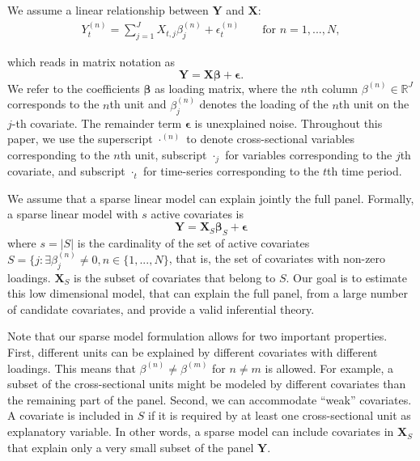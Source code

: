 \documentclass[11pt]{article}
\newcommand{\RR}{\mathbb{R}}
\begin{document}
	We assume a linear relationship between $\bm{Y}$ and $\bm{X}$:
	\begin{align*}
		Y_{t}^{(n)} = \sum_{j=1}^J X_{t,j} \beta_{j}^{(n)} + \epsilon_{t}^{(n)} \qquad \text{for $n=1,...,N$},
	\end{align*} 
	
	which reads in matrix notation as 
	\begin{equation}\label{1}
		\bm{Y}=\bm{X}\bm{\beta}+\bm{\epsilon}.
	\end{equation}
	We refer to the coefficients $\bm{\beta}$ as loading matrix, where the $n$th column $\beta^{(n)}\in\RR^{J}$ corresponds to the $n$th unit and $\beta^{(n)}_{j}$ denotes the loading of the $n$th unit on the $j$-th covariate. The remainder term $\bm{\epsilon}$ is unexplained noise. Throughout this paper, we use the superscript $\cdot^{(n)}$ to denote cross-sectional variables corresponding to the $n$th unit, subscript $\cdot_j$ for variables corresponding to the $j$th covariate, and subscript $\cdot_t$ for time-series corresponding to the $t$th time period.
	
	
	We assume that a sparse linear model can explain jointly the full panel. Formally, a sparse linear model with $s$ active covariates is 
	\begin{equation}\label{2}
		\bm{Y}=\bm{X}_S\bm{\beta}_S+\bm{\epsilon}
	\end{equation}
	where  $s=|S|$ is the cardinality of the set of active covariates $S=\{j:\exists  \beta^{(n)}_{j}\neq 0, n \in \{1,...,N\}$, that is, the set of covariates with non-zero loadings. $\bm{X}_S$ is the subset of covariates that belong to $S$. Our goal is to estimate this low dimensional model, that can explain the full panel, from a large number of candidate covariates, and provide a valid inferential theory.
	
	Note that our sparse model formulation allows for two important properties. First, different units can be explained by different covariates with different loadings. This means that $\beta^{(n)}\neq \beta^{(m)}$ for $n \neq m$ is allowed. For example, a subset of the cross-sectional units might be modeled by different covariates than the remaining part of the panel. Second, we can accommodate ``weak'' covariates. A covariate is included in $S$ if it is required by at least one cross-sectional unit as explanatory variable. In other words, a sparse model can include covariates in $\bm{X}_S$ that explain only a very small subset of the panel $\bm{Y}$.
	
	
	
\end{document}
